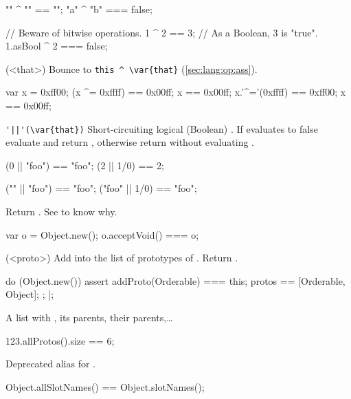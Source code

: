 \begin{urbiscriptapi}
\begin{urbiassert}
 "" ^ ""  == "";
"a" ^ "b" === false;

// Beware of bitwise operations.
1 ^ 2        == 3;     // As a Boolean, 3 is "true".
1.asBool ^ 2 === false;
\end{urbiassert}


\item['^='](<that>)%
  Bounce to \lstinline|this ^ \var{that}| (\autoref{sec:lang:op:ass}).
\begin{urbiassert}
var x = 0xff00;
(x ^= 0xffff)  == 0x00ff;  x == 0x00ff;
x.'^='(0xffff) == 0xff00;  x == 0x00ff;
\end{urbiassert}


\item \lstinline+'||'(\var{that})+%
  Short-circuiting logical (Boolean) . If \this evaluates to false
  evaluate and return , otherwise return \this without evaluating
  .
\begin{urbiassert}
(0 || "foo") == "foo";
(2 ||  1/0)  == 2;

(""    || "foo") == "foo";
("foo" || 1/0)   == "foo";
\end{urbiassert}


\item['$id']%


\item[acceptVoid]
  Return \this.  See  to know why.
\begin{urbiassert}
var o = Object.new();
o.acceptVoid() === o;
\end{urbiassert}


\item[addProto](<proto>)%
  Add  into the list of prototypes of \this.  Return \this.
\begin{urbiscript}
do (Object.new())
{
  assert
  {
    addProto(Orderable) === this;
    protos == [Orderable, Object];
  };
}|;
\end{urbiscript}


\item[allProto]%
  A list with \this, its parents, their parents,\ldots
\begin{urbiassert}
123.allProtos().size == 6;
\end{urbiassert}


\item[allSlotNames]
  Deprecated alias for .
\begin{urbiassert}
Object.allSlotNames() == Object.slotNames();
\end{urbiassert}



\end{urbiscriptapi}
